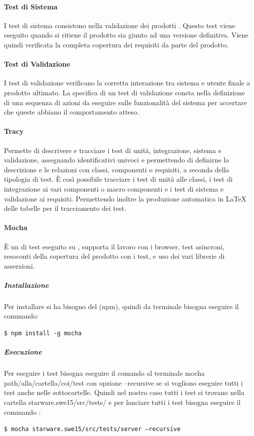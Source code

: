 \documentclass[12pt,a4paper]{article}
\begin{document}
\paragraph{Test di Sistema}

I test di sistema consistono nella validazione dei prodotti . Questo test viene eseguito quando si ritiene il prodotto sia giunto ad una versione definitiva. Viene quindi verificata la completa copertura dei requisiti da parte del prodotto.

\paragraph{Test di Validazione}

I test di validazione verificano la corretta interazione tra sistema e utente finale a prodotto ultimato.
La specifica di un test di validazione consta nella definizione di una sequenza di azioni da eseguire sulle funzionalità del sistema per accertare che queste abbiano il comportamento atteso.


\paragraph{Tracy}\label{tracciamentoTest}

Permette di descrivere e tracciare i test di unità, integrazione, sistema e validazione, assegnando identificativi univoci e permettendo di definirne la descrizione e le relazioni con classi, componenti o requisiti, a seconda della tipologia di test. È così possibile tracciare i test di unità alle classi, i test di integrazione ai vari componenti o macro componenti e i test di sistema e validazione ai requisiti.
Permettendo inoltre la produzione automatica in \LaTeX{} delle tabelle per il tracciamento dei test.

\paragraph{Mocha}\label{strumentoTest}
È un  di test eseguito su , supporta il lavoro con i browser, test asincroni, resoconti della copertura del prodotto con i test, e uso dei vari librerie di asserzioni.
\subparagraph{Installazione}
Per installare  si ha bisogno del  (npm), quindi da terminale bisogna eseguire il commando:
\begin{center}
	\texttt{\$ npm install -g mocha}  
\end{center}
\subparagraph{Esecuzione}
Per eseguire i test bisogna eseguire il comando al terminale mocha path/alla/cartella/coi/test con opzione --recursive se si vogliono eseguire tutti i test anche nelle sottocartelle.
Quindi nel nostro caso tutti i test si trovano nella cartella starware.swe15/src/tests/ e per lanciare tutti i test bisogna eseguire il commando : 
\begin{center}
	\texttt{\$ mocha starware.swe15/src/tests/server --recursive
}
\end{center}
\end{document}
